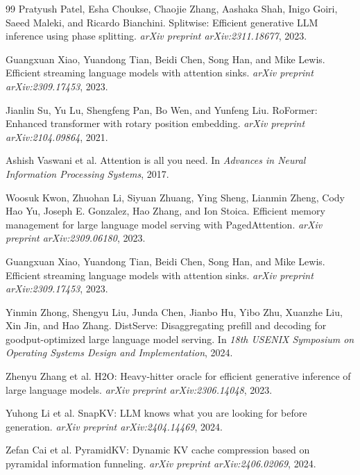 \documentclass[11pt]{article}
\theoremstyle{definition}
\theoremstyle{plain}
\begin{document}
\begin{thebibliography}{99}
Pratyush Patel, Esha Choukse, Chaojie Zhang, Aashaka Shah, Inigo Goiri, Saeed Maleki, and Ricardo Bianchini.
\newblock Splitwise: Efficient generative LLM inference using phase splitting.
\newblock \emph{arXiv preprint arXiv:2311.18677}, 2023.

Guangxuan Xiao, Yuandong Tian, Beidi Chen, Song Han, and Mike Lewis.
\newblock Efficient streaming language models with attention sinks.
\newblock \emph{arXiv preprint arXiv:2309.17453}, 2023.

Jianlin Su, Yu Lu, Shengfeng Pan, Bo Wen, and Yunfeng Liu.
\newblock RoFormer: Enhanced transformer with rotary position embedding.
\newblock \emph{arXiv preprint arXiv:2104.09864}, 2021.

Ashish Vaswani et al.
\newblock Attention is all you need.
\newblock In \emph{Advances in Neural Information Processing Systems}, 2017.

Woosuk Kwon, Zhuohan Li, Siyuan Zhuang, Ying Sheng, Lianmin Zheng, Cody Hao Yu, Joseph E. Gonzalez, Hao Zhang, and Ion Stoica.
\newblock Efficient memory management for large language model serving with PagedAttention.
\newblock \emph{arXiv preprint arXiv:2309.06180}, 2023.

Guangxuan Xiao, Yuandong Tian, Beidi Chen, Song Han, and Mike Lewis.
\newblock Efficient streaming language models with attention sinks.
\newblock \emph{arXiv preprint arXiv:2309.17453}, 2023.

Yinmin Zhong, Shengyu Liu, Junda Chen, Jianbo Hu, Yibo Zhu, Xuanzhe Liu, Xin Jin, and Hao Zhang.
\newblock DistServe: Disaggregating prefill and decoding for goodput-optimized large language model serving.
\newblock In \emph{18th USENIX Symposium on Operating Systems Design and Implementation}, 2024.

Zhenyu Zhang et al.
\newblock H2O: Heavy-hitter oracle for efficient generative inference of large language models.
\newblock \emph{arXiv preprint arXiv:2306.14048}, 2023.

Yuhong Li et al.
\newblock SnapKV: LLM knows what you are looking for before generation.
\newblock \emph{arXiv preprint arXiv:2404.14469}, 2024.

Zefan Cai et al.
\newblock PyramidKV: Dynamic KV cache compression based on pyramidal information funneling.
\newblock \emph{arXiv preprint arXiv:2406.02069}, 2024.


\end{thebibliography}
\end{document}
